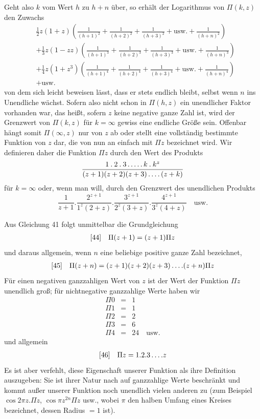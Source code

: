 Geht also $k$ vom Wert $h$ zu $h+n$ über, so erhält der Logarithmus von $\Pi(k,z)$ den Zuwachs
\[
\begin{aligned}
&\tfrac12 z(1+z)\left(\frac1{(h+1)^2}+\frac1{(h+2)^2}+\frac1{(h+3)^2}+\text{usw.}+\frac1{(h+n)^2}\right)\\[5pt]
&+\tfrac13 z(1-zz)\left(\frac1{(h+1)^3}+\frac1{(h+2)^3}+\frac1{(h+3)^3}+\text{usw.}+\frac1{(h+n)^3}\right)\\[5pt]
&+\tfrac14 z(1+z^3)\left(\frac1{(h+1)^4}+\frac1{(h+2)^4}+\frac1{(h+3)^4}+\text{usw.}+\frac1{(h+n)^4}\right)\\[5pt]
&+\text{usw.}
\end{aligned}
\]
von dem sich leicht beweisen lässt, dass er stets endlich bleibt, selbst wenn $n$ ins Unendliche wächst. Sofern also nicht schon in $\Pi(h,z)$ ein unendlicher Faktor vorhanden war, das heißt, sofern $z$ keine negative ganze Zahl ist, wird der Grenzwert von $\Pi(k,z)$ für $k=\infty$ gewiss eine endliche Größe sein. Offenbar hängt somit $\Pi(\infty,z)$ nur von $z$ ab oder stellt eine vollständig bestimmte Funktion von $z$ dar, die von nun an einfach mit $\Pi z$ bezeichnet wird. Wir definieren daher die Funktion $\Pi z$ durch den Wert des Produkts
\[
\frac{1\mathbin{.}2\mathbin{.}3\mathinner{.\,.\,.\,.\,.}k\mathbin{.}k^z}{(z+1)(z+2)(z+3)\mathinner{.\,.\,.\,.}(z+k)}
\]
für $k=\infty$ oder, wenn man will, durch den Grenzwert des unendlichen Produkts
\[
\frac{1}{z+1}.\frac{2^{z+1}}{1^z(2+z)}.
\frac{3^{z+1}}{2^z(3+z)}.\frac{4^{z+1}}{3^z(4+z)}\quad\mathrm{usw.}
\]

Aus Gleichung 41 folgt unmittelbar die Grundgleichung
\[
\begin{array}{@{}ll@{}}
[44]&\displaystyle\Pi(z+1)=(z+1)\Pi z
\end{array}
\]
und daraus allgemein, wenn $n$ eine beliebige positive ganze Zahl bezeichnet,
\[
\begin{array}{@{}ll@{}}
[45]&\displaystyle\Pi(z+n)=(z+1)(z+2)(z+3)\,.\,.\,.\,.(z+n)\Pi z
\end{array}
\]
Für einen negativen ganzzahligen Wert von $z$ ist der Wert der Funktion $\Pi z$ unendlich groß; für nichtnegative ganzzahlige Werte haben wir
\[
\begin{array}{rcl}
\Pi0&=&1\\
\Pi1&=&1\\
\Pi2&=&2\\
\Pi3&=&6\\
\Pi4&=&24\quad\mathrm{usw.}
\end{array}
\]
und allgemein
\[
\begin{array}{@{}ll@{}}
[46]&\displaystyle\Pi z=1.2.3\,.\,.\,.\,.z
\end{array}
\]
Es ist aber verfehlt, diese Eigenschaft unserer Funktion als ihre Definition auszugeben: Sie ist ihrer Natur nach auf ganzzahlige Werte beschränkt und kommt außer unserer Funktion noch unendlich vielen anderen zu (zum Beispiel $\cos2\pi z.\Pi z$, $\cos\pi z^{2n}\Pi z$ usw., wobei $\pi$ den halben Umfang eines Kreises bezeichnet, dessen Radius $=1$ ist).

